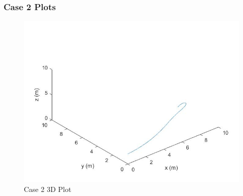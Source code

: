 \documentclass[12pt,twoside,letterpaper]{article}
\begin{document}
\subsubsection{Case 2 Plots}
\begin{figure}[H]
\centering
\includegraphics[width=15cm]{figures/case_2_3D.jpg}
\caption{Case 2 3D Plot}
\label{Case 2 3D Plot}
\end{figure}
\end{document}
